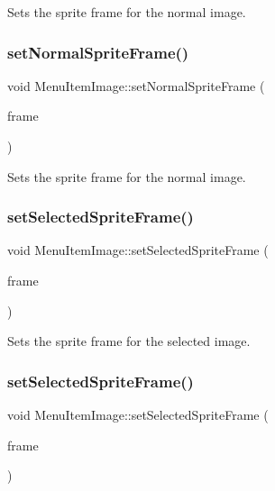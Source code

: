 Sets the sprite frame for the normal image. \mbox{\label{classMenuItemImage_ac85fee9b02f2199a96d52ddf14a1ae89}} 
\subsubsection{\texorpdfstring{set\+Normal\+Sprite\+Frame()}{setNormalSpriteFrame()}\hspace{0.1cm}{\footnotesize\ttfamily [2/2]}}
{\footnotesize\ttfamily void Menu\+Item\+Image\+::set\+Normal\+Sprite\+Frame (\begin{DoxyParamCaption}\item[{\hyperlink{classSpriteFrame}{Sprite\+Frame} $\ast$}]{frame }\end{DoxyParamCaption})}

Sets the sprite frame for the normal image. \mbox{\label{classMenuItemImage_a574ca5c9be7143cda3403ba3174aa249}} 
\subsubsection{\texorpdfstring{set\+Selected\+Sprite\+Frame()}{setSelectedSpriteFrame()}\hspace{0.1cm}{\footnotesize\ttfamily [1/2]}}
{\footnotesize\ttfamily void Menu\+Item\+Image\+::set\+Selected\+Sprite\+Frame (\begin{DoxyParamCaption}\item[{\hyperlink{classSpriteFrame}{Sprite\+Frame} $\ast$}]{frame }\end{DoxyParamCaption})}

Sets the sprite frame for the selected image. \mbox{\label{classMenuItemImage_a574ca5c9be7143cda3403ba3174aa249}} 
\subsubsection{\texorpdfstring{set\+Selected\+Sprite\+Frame()}{setSelectedSpriteFrame()}\hspace{0.1cm}{\footnotesize\ttfamily [2/2]}}
{\footnotesize\ttfamily void Menu\+Item\+Image\+::set\+Selected\+Sprite\+Frame (\begin{DoxyParamCaption}\item[{\hyperlink{classSpriteFrame}{Sprite\+Frame} $\ast$}]{frame }\end{DoxyParamCaption})}

